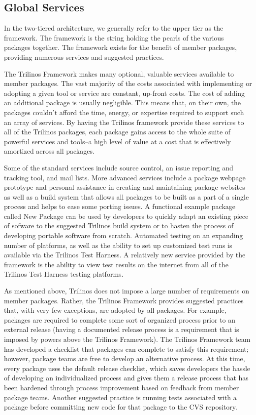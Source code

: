 \documentclass[12pt,relax]{article}
\begin{document}
\subsection{Global Services}
\label{subsect:GlobalServices}

In the two-tiered architecture, we generally refer to the upper tier as the
framework.  The framework is the string holding the pearls of the various
packages together.  The framework exists for the benefit of member
packages, providing numerous services and suggested practices.

The Trilinos Framework makes many optional, valuable services available to
member packages.  The vast majority of the costs associated with implementing
or adopting a given tool or service are constant, up-front costs.  The cost of
adding an additional package is usually negligible.  This means that, on their
own, the packages couldn't afford the time, energy, or expertise required to
support such an array of services.  By having the Trilinos framework
provide these services to all of the Trilinos packages, each package gains
access to the whole suite of powerful services and tools--a high level of value
at a cost that is effectively amortized across all packages.

Some of the standard services include source control, an issue reporting and
tracking tool, and mail lists.  More advanced services include a package
webpage prototype and personal assistance in creating and maintaining package
websites as well as a build system that allows all packages to be built as a
part of a single process and helps to ease some porting issues.  A functional
example package called New Package can be used by developers to quickly adapt
an existing piece of sofware to the suggested Trilinos build system or to 
hasten the process of developing portable software from scratch.  Automated 
testing on an expanding number of platforms, as well as the ability to set up 
customized test runs is available via the Trilinos Test Harness.  A relatively 
new service provided by  the framework is the ability to view test results 
on the internet from all of the Trilinos Test Harness testing platforms.

As mentioned above, Trilinos does not impose a large number of requirements
on member packages.  Rather, the Trilinos Framework provides suggested 
practices that, with very few exceptions, are adopted by all packages.
For example, packages are required to complete some sort of organized
process prior to an external release (having a documented release
process is a requirement that is imposed by powers above the Trilinos
Framework).  The Trilinos Framework team has developed a checklist that
packages can complete to satisfy this requirement; however, package teams
are free to develop an alternative process.  At this time, every package
uses the default release checklist, which saves developers the hassle of
developing an individualized process and gives them a release process that
has been hardened through process improvement based on feedback from
member package teams.  Another suggested practice is running tests
associated with a package before committing new code for that package to the 
CVS repository.
\end{document}
